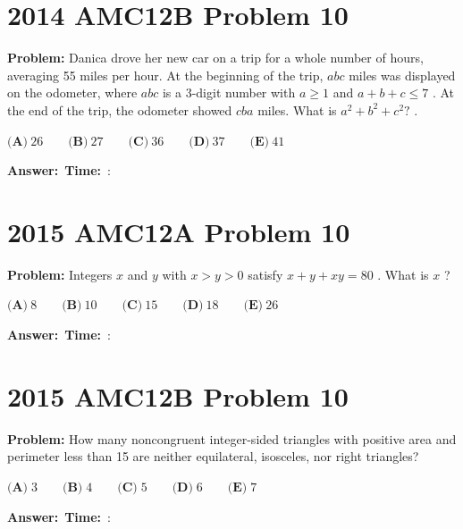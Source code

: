 \documentclass[12pt]{article}
\begin{document}
\vspace{0.5cm}

\section{2014 AMC12B Problem 10}

\textbf{Problem:}
Danica drove her new car on a trip for a whole number of hours, averaging 55 miles per hour. At the beginning of the trip, $abc$ miles was displayed on the odometer, where $abc$ is a 3-digit number with $a \geq{1}$ and $a+b+c \leq{7}$ . At the end of the trip, the odometer showed $cba$ miles. What is $a^2+b^2+c^2?$ .

$\textbf{(A)}\ 26\qquad\textbf{(B)}\ 27\qquad\textbf{(C)}\ 36\qquad\textbf{(D)}\ 37\qquad\textbf{(E)}\ 41$

\vspace{0.3cm}
\noindent\textbf{Answer:}~\underline{\hspace{5cm}}\hfill\textbf{Time:}~\underline{\hspace{1.2cm}}:\underline{\hspace{1.2cm}}

\vspace{0.5cm}

\section{2015 AMC12A Problem 10}

\textbf{Problem:}
Integers $x$ and $y$ with $x>y>0$ satisfy $x+y+xy=80$ . What is $x$ ?

$\textbf{(A)}\ 8 \qquad\textbf{(B)}\ 10 \qquad\textbf{(C)}\ 15 \qquad\textbf{(D)}\ 18 \qquad\textbf{(E)}\ 26$

\vspace{0.3cm}
\noindent\textbf{Answer:}~\underline{\hspace{5cm}}\hfill\textbf{Time:}~\underline{\hspace{1.2cm}}:\underline{\hspace{1.2cm}}

\vspace{0.5cm}

\section{2015 AMC12B Problem 10}

\textbf{Problem:}
How many noncongruent integer-sided triangles with positive area and perimeter less than 15 are neither equilateral, isosceles, nor right triangles?

$\textbf{(A)}\; 3 \qquad\textbf{(B)}\; 4 \qquad\textbf{(C)}\; 5 \qquad\textbf{(D)}\; 6 \qquad\textbf{(E)}\; 7$

\vspace{0.3cm}
\noindent\textbf{Answer:}~\underline{\hspace{5cm}}\hfill\textbf{Time:}~\underline{\hspace{1.2cm}}:\underline{\hspace{1.2cm}}

\vspace{0.5cm}
\end{document}
